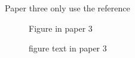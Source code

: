 Paper three only use the reference \cite{CarrYu2012}

\lipsum[1-15]
\begin{figure}
Figure in paper 3
\caption{figure text in paper 3}
\end{figure}
\lipsum[1-15]
